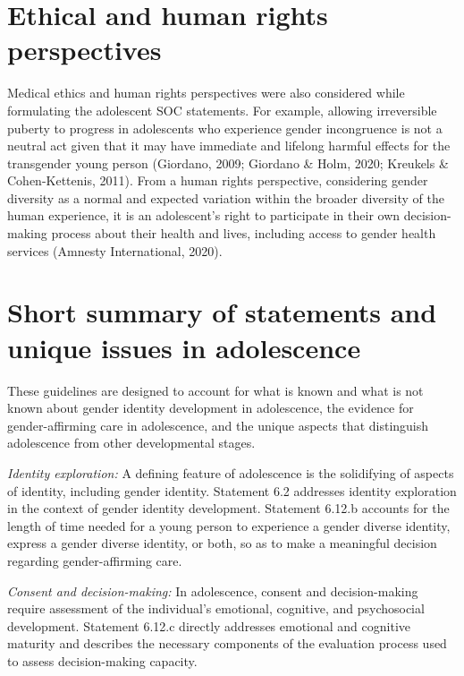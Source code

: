\documentclass[
]{book}
\begin{document}
\hypertarget{ethical-and-human-rights-perspectives}{%
\section*{Ethical and human rights perspectives}\label{ethical-and-human-rights-perspectives}}

Medical ethics and human rights perspectives
were also considered while formulating the
adolescent SOC statements. For example, allowing irreversible puberty to progress in adolescents who experience gender incongruence is
not a neutral act given that it may have immediate and lifelong harmful effects for the transgender young person (Giordano, 2009; Giordano
\& Holm, 2020; Kreukels \& Cohen-Kettenis,
2011). From a human rights perspective, considering gender diversity as a normal and
expected variation within the broader diversity
of the human experience, it is an adolescent's
right to participate in their own decision-making
process about their health and lives, including
access to gender health services (Amnesty
International, 2020).

\hypertarget{short-summary-of-statements-and-unique-issues-in-adolescence}{%
\section*{Short summary of statements and unique issues in adolescence}\label{short-summary-of-statements-and-unique-issues-in-adolescence}}

These guidelines are designed to account for what
is known and what is not known about gender
identity development in adolescence, the evidence
for gender-affirming care in adolescence, and the
unique aspects that distinguish adolescence from
other developmental stages.

\emph{Identity exploration:} A defining feature of adolescence
is the solidifying of aspects of identity, including gender identity. Statement 6.2 addresses identity exploration in the context of gender identity development.
Statement 6.12.b accounts for the length of time
needed for a young person to experience a gender
diverse identity, express a gender diverse identity, or
both, so as to make a meaningful decision regarding
gender-affirming care.

\emph{Consent and decision-making:} In adolescence, consent
and decision-making require assessment of the individual's emotional, cognitive, and psychosocial development. Statement 6.12.c directly addresses emotional
and cognitive maturity and describes the necessary
components of the evaluation process used to assess
decision-making capacity.
\end{document}
